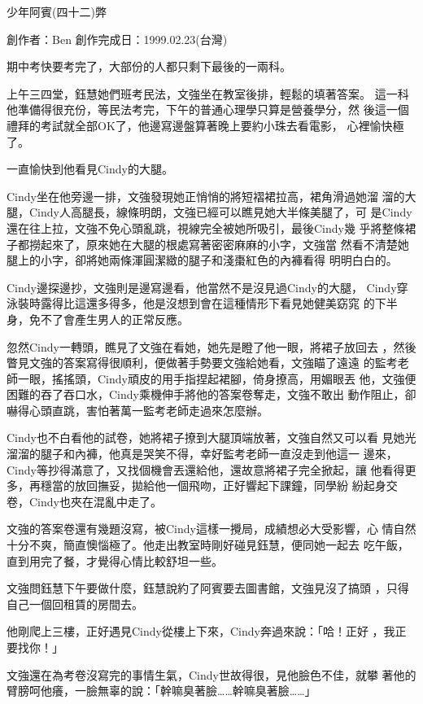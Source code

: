 



少年阿賓(四十二)弊

創作者：Ben
創作完成日：1999.02.23(台灣)


期中考快要考完了，大部份的人都只剩下最後的一兩科。

上午三四堂，鈺慧她們班考民法，文強坐在教室後排，輕鬆的填著答案。
這一科他準備得很充份，等民法考完，下午的普通心理學只算是營養學分，然
後這一個禮拜的考試就全部OK了，他邊寫邊盤算著晚上要約小珠去看電影，
心裡愉快極了。

一直愉快到他看見Cindy的大腿。

Cindy坐在他旁邊一排，文強發現她正悄悄的將短褶裙拉高，裙角滑過她溜
溜的大腿，Cindy人高腿長，線條明朗，文強已經可以瞧見她大半條美腿了，可
是Cindy還在往上拉，文強不免心頭亂跳，視線完全被她所吸引，最後Cindy幾
乎將整條裙子都撈起來了，原來她在大腿的根處寫著密密麻麻的小字，文強當
然看不清楚她腿上的小字，卻將她兩條渾圓潔緻的腿子和淺棗紅色的內褲看得
明明白白的。

Cindy邊探邊抄，文強則是邊寫邊看，他當然不是沒見過Cindy的大腿，
Cindy穿泳裝時露得比這還多得多，他是沒想到會在這種情形下看見她健美窈窕
的下半身，免不了會產生男人的正常反應。

忽然Cindy一轉頭，瞧見了文強在看她，她先是瞪了他一眼，將裙子放回去
，然後瞥見文強的答案寫得很順利，便做著手勢要文強給她看，文強瞄了遠遠
的監考老師一眼，搖搖頭，Cindy頑皮的用手指捏起裙腳，倚身撩高，用媚眼丟
他，文強便困難的吞了吞口水，Cindy乘機伸手將他的答案卷奪走，文強不敢出
動作阻止，卻嚇得心頭直跳，害怕著萬一監考老師走過來怎麼辦。

Cindy也不白看他的試卷，她將裙子撩到大腿頂端放著，文強自然又可以看
見她光溜溜的腿子和內褲，他真是哭笑不得，幸好監考老師一直沒走到他這一
邊來，Cindy等抄得滿意了，又找個機會丟還給他，還故意將裙子完全掀起，讓
他看得更多，再穩當的放回撫妥，拋給他一個飛吻，正好響起下課鐘，同學紛
紛起身交卷，Cindy也夾在混亂中走了。

文強的答案卷還有幾題沒寫，被Cindy這樣一攪局，成績想必大受影響，心
情自然十分不爽，簡直懊惱極了。他走出教室時剛好碰見鈺慧，便同她一起去
吃午飯，直到用完了餐，才覺得心情比較舒坦一些。

文強問鈺慧下午要做什麼，鈺慧說約了阿賓要去圖書館，文強見沒了搞頭
，只得自己一個回租賃的房間去。

他剛爬上三樓，正好遇見Cindy從樓上下來，Cindy奔過來說：「哈！正好
，我正要找你！」

文強還在為考卷沒寫完的事情生氣，Cindy世故得很，見他臉色不佳，就攀
著他的臂膀呵他癢，一臉無辜的說：「幹嘛臭著臉……幹嘛臭著臉……」

